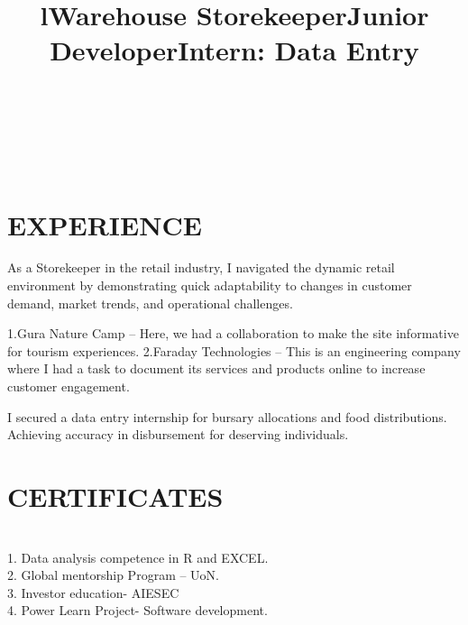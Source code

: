 \documentclass[margin]{res}
\begin{document}
\begin{resume}

\begin{format}
\title{l}\\
\\
\body\\
\end{format}

\section{EXPERIENCE}
\title{\textbf{Warehouse Storekeeper}}
\begin{position}
As a Storekeeper in the retail industry, I navigated the dynamic retail environment by demonstrating quick adaptability to changes in customer demand, market trends, and operational challenges.
\end{position}

\location{}
\title{\textbf{Junior Developer}}
\begin{position}
1.Gura Nature Camp – Here, we had a collaboration to make the site informative for tourism experiences.
2.Faraday Technologies – This is an engineering company where I had a task to document its services and products online to increase customer engagement.

\end{position}

\title{\textbf{Intern: Data Entry}}
\begin{position}
I secured a data entry internship for bursary allocations and food distributions. Achieving accuracy in disbursement for deserving individuals.
\end{position}
\section{CERTIFICATES}\\
1. Data analysis competence in R and EXCEL.\\
2. Global mentorship Program – UoN.\\
3. Investor education- AIESEC\\
4. Power Learn Project- Software development.


\end{resume}
\end{document}
